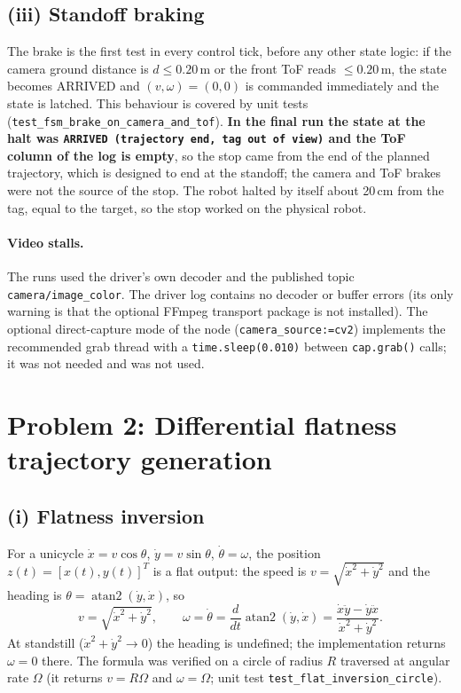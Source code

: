 \documentclass[11pt,a4paper]{article}
\begin{document}
\subsection{(iii) Standoff braking}
The brake is the first test in every control tick, before any other state logic: if the camera ground distance is $d\le0.20$\,m or the front ToF reads $\le0.20$\,m, the state becomes ARRIVED and $(v,\omega)=(0,0)$ is commanded immediately and the state is latched. This behaviour is covered by unit tests (\texttt{test\_fsm\_brake\_on\_camera\_and\_tof}). \textbf{In the final run the state at the halt was \texttt{ARRIVED (trajectory end, tag out of view)} and the ToF column of the log is empty}, so the stop came from the end of the planned trajectory, which is designed to end at the standoff; the camera and ToF brakes were not the source of the stop. The robot halted by itself about 20\,cm from the tag, equal to the target, so the stop worked on the physical robot.

\paragraph{Video stalls.} The runs used the driver's own decoder and the published topic \texttt{camera/image\_color}. The driver log contains no decoder or buffer errors (its only warning is that the optional FFmpeg transport package is not installed). The optional direct-capture mode of the node (\texttt{camera\_source:=cv2}) implements the recommended grab thread with a \texttt{time.sleep(0.010)} between \texttt{cap.grab()} calls; it was not needed and was not used.

\section{Problem 2: Differential flatness trajectory generation}

\subsection{(i) Flatness inversion}
For a unicycle $\dot x=v\cos\theta$, $\dot y=v\sin\theta$, $\dot\theta=\omega$, the position $z(t)=[x(t),y(t)]^T$ is a flat output: the speed is $v=\sqrt{\dot x^2+\dot y^2}$ and the heading is $\theta=\operatorname{atan2}(\dot y,\dot x)$, so
\begin{equation}
v=\sqrt{\dot x^2+\dot y^2},\qquad
\omega=\dot\theta=\frac{d}{dt}\operatorname{atan2}(\dot y,\dot x)=\frac{\dot x\ddot y-\dot y\ddot x}{\dot x^2+\dot y^2}.\tag{1}
\end{equation}
At standstill ($\dot x^2+\dot y^2\to0$) the heading is undefined; the implementation returns $\omega=0$ there. The formula was verified on a circle of radius $R$ traversed at angular rate $\Omega$ (it returns $v=R\Omega$ and $\omega=\Omega$; unit test \texttt{test\_flat\_inversion\_circle}).
\end{document}
